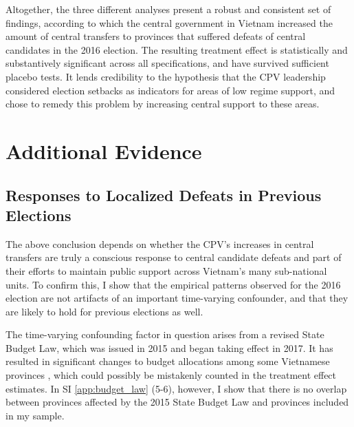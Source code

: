 \documentclass[12pt]{article}
\newcommand{\1}{\mathbbm{1}}
\begin{document}
Altogether, the three different analyses present a robust and consistent set of findings, according to which the central government in Vietnam increased the amount of central transfers to provinces that suffered defeats of central candidates in the 2016 election. The resulting treatment effect is statistically and substantively significant across all specifications, and have survived sufficient placebo tests. It lends credibility to the hypothesis that the CPV leadership considered election setbacks as indicators for areas of low regime support, and chose to remedy this problem by increasing central support to these areas.

\section{Additional Evidence}
\label{sec:additional}

\subsection{Responses to Localized Defeats in Previous Elections}

The above conclusion depends on whether the CPV's increases in central transfers are truly  a conscious response to central candidate defeats and part of their efforts to maintain public support across Vietnam's many sub-national units. To confirm this, I show that the empirical patterns observed for the 2016 election are not artifacts of an important time-varying confounder, and that they are likely to hold for previous elections as well.

The time-varying confounding factor in question arises from a revised State Budget Law, which was issued in 2015 and began taking effect in 2017. It has resulted in significant changes to budget allocations among some Vietnamese provinces \citep{BaoViet2016}, which could possibly be mistakenly counted in the treatment effect estimates. In SI \ref{app:budget_law} (5-6), however, I show that there is no overlap between provinces affected by the 2015 State Budget Law and provinces included in my sample.
\end{document}
